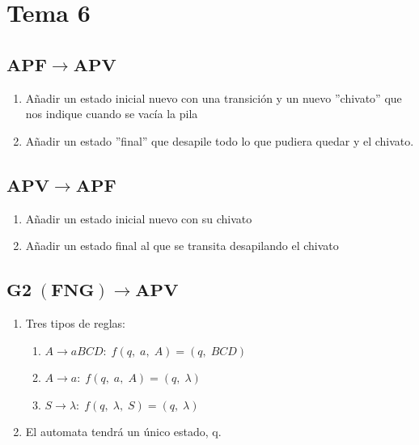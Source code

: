 \documentclass[12pt, twoside, openright]{report} %
\begin{document}
\section{Tema 6}
\subsection{$\boldsymbol{APF \rightarrow APV}$}
\begin{enumerate}
	\item Añadir un estado inicial nuevo con una transición y un nuevo ''chivato'' que nos indique cuando se vacía la pila
	\item Añadir un estado ''final'' que desapile todo lo que pudiera quedar y el chivato.
\end{enumerate}
\subsection{$\boldsymbol{APV \rightarrow APF}$}
\begin{enumerate}
	\item Añadir un estado inicial nuevo con su chivato
	\item Añadir un estado final al que se transita desapilando el chivato
\end{enumerate}

\subsection{$\boldsymbol{G2 \; (FNG) \rightarrow APV}$}
\begin{enumerate}
	\item Tres tipos de reglas:
	      \begin{enumerate}
		      \item $A \rightarrow aBCD: \; f(q,\; a,\; A) = (q,\; BCD)$
		      \item $A \rightarrow a: \; f(q,\; a,\; A) = (q,\; \lambda)$
		      \item $S \rightarrow \lambda: \; f(q,\; \lambda,\; S) = (q,\; \lambda)$
	      \end{enumerate}
	\item El automata tendrá un único estado, q.
\end{enumerate}
\end{document}

